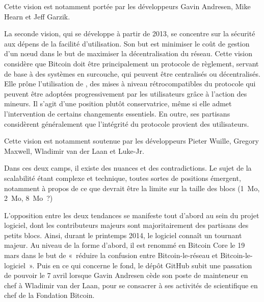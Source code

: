 Cette vision est notamment portée par les développeurs Gavin Andresen, Mike Hearn et Jeff Garzik.

La seconde vision, qui se développe à partir de 2013, se concentre sur la sécurité aux dépens de la facilité d'utilisation. Son but est minimiser le coût de gestion d'un nœud dans le but de maximiser la décentralisation du réseau. Cette vision considère que Bitcoin doit être principalement un protocole de règlement, servant de base à des systèmes en surcouche, qui peuvent être centralisés ou décentralisés. Elle prône l'utilisation de , des mises à niveau rétrocompatibles du protocole qui peuvent être adoptées progressivement par les utilisateurs grâce à l'action des mineurs. Il s'agit d'une position plutôt conservatrice, même si elle admet l'intervention de certains changements essentiels. En outre, ses partisans considèrent généralement que l'intégrité du protocole provient des utilisateurs.  %

Cette vision est notamment soutenue par les développeurs Pieter Wuille, Gregory Maxwell, Wladimir van der Laan et Luke-Jr.

Dans ces deux camps, il existe des nuances et des contradictions. Le sujet de la scalabilité étant complexe et technique, toutes sortes de positions émergent, notamment à propos de ce que devrait être la limite sur la taille des blocs (1~Mo, 2~Mo, 8~Mo~?)

L'opposition entre les deux tendances se manifeste tout d'abord au sein du projet logiciel, dont les contributeurs majeurs sont majoritairement des partisans des petits blocs. Ainsi, durant le printemps 2014, le logiciel connaît un tournant majeur. Au niveau de la forme d'abord, il est renommé en Bitcoin Core le 19 mars dans le but de «~réduire la confusion entre Bitcoin-le-réseau et Bitcoin-le-logiciel~». Puis en ce qui concerne le fond, le dépôt GitHub subit une passation de pouvoir le 7 avril lorsque Gavin Andresen cède son poste de mainteneur en chef à Wladimir van der Laan, pour se consacrer à ses activités de scientifique en chef de la Fondation Bitcoin.

